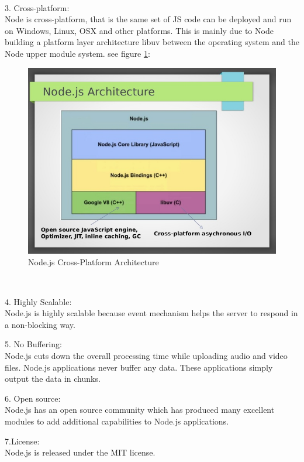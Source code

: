 \\
\item 3. Cross-platform: \\ Node is cross-platform, that is the same set of JS code can be deployed and run on Windows, Linux, OSX and other platforms. This is mainly due to Node building a platform layer architecture libuv between the operating system and the Node upper module system. see figure \ref{fig:6.1 cubed graph}:
\begin{figure}[h]
	\centering
	\includegraphics[scale=0.4]{img/nodejs2.png}
	\caption{Node.js Cross-Platform Architecture}
	\label{fig:6.1 cubed graph}
\end{figure}
\\
\item 4. Highly Scalable: \\  Node.js is highly scalable because event mechanism helps the server to respond in a non-blocking way. \\
\item 5. No Buffering: \\ Node.js cuts down the overall processing time while uploading audio and video files. Node.js applications never buffer any data. These applications simply output the data in chunks. \\ 
\item 6. Open source: \\ Node.js has an open source community which has produced many excellent modules to add additional capabilities to Node.js applications. \\
\item 7.License: \\ Node.js is released under the MIT license.


